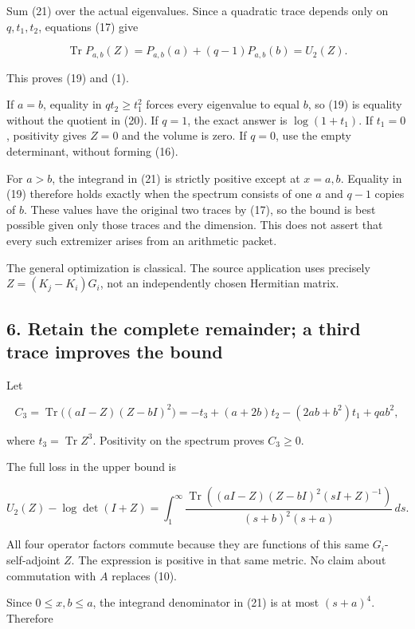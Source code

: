 \documentclass[
  11pt,
]{article}
\begin{document}
Sum (21) over the actual eigenvalues. Since a quadratic trace depends
only on \(q,t_1,t_2\), equations (17) give

\[
 \operatorname{Tr}P_{a,b}(Z)=P_{a,b}(a)+(q-1)P_{a,b}(b)=U_2(Z).
\]

This proves (19) and (1).

If \(a=b\), equality in \(qt_2\ge t_1^2\) forces every eigenvalue to
equal \(b\), so (19) is equality without the quotient in (20). If
\(q=1\), the exact answer is \(\log(1+t_1)\). If \(t_1=0\), positivity
gives \(Z=0\) and the volume is zero. If \(q=0\), use the empty
determinant, without forming (16).

For \(a>b\), the integrand in (21) is strictly positive except at
\(x=a,b\). Equality in (19) therefore holds exactly when the spectrum
consists of one \(a\) and \(q-1\) copies of \(b\). These values have the
original two traces by (17), so the bound is best possible given only
those traces and the dimension. This does not assert that every such
extremizer arises from an arithmetic packet.

The general optimization is classical. The source application uses
precisely \(Z=(K_j-K_i)G_i\), not an independently chosen Hermitian
matrix.

\subsection{6. Retain the complete remainder; a third trace improves the
bound}\label{retain-the-complete-remainder-a-third-trace-improves-the-bound}

Let

\[
 C_3=\operatorname{Tr}\bigl((aI-Z)(Z-bI)^2\bigr)
 =-t_3+(a+2b)t_2-(2ab+b^2)t_1+qa b^2,
\]

where \(t_3=\operatorname{Tr}Z^3\). Positivity on the spectrum proves
\(C_3\ge0\).

The full loss in the upper bound is

\[
 \boxed{
 U_2(Z)-\log\det(I+Z)
 =\int_1^\infty
 \frac{\operatorname{Tr}((aI-Z)(Z-bI)^2(sI+Z)^{-1})}
 {(s+b)^2(s+a)}\,ds.
 }                                                             \tag{22}
\]

All four operator factors commute because they are functions of this
same \(G_i\)-self-adjoint \(Z\). The expression is positive in that same
metric. No claim about commutation with \(A\) replaces (10).

Since \(0\le x,b\le a\), the integrand denominator in (21) is at most
\((s+a)^4\). Therefore
\end{document}
